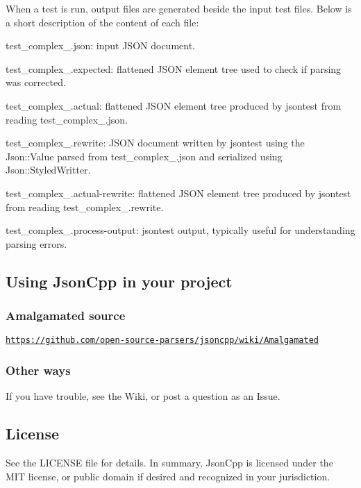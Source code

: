 When a test is run, output files are generated beside the input test files. Below is a short description of the content of each file\+:


\begin{DoxyItemize}
\item {\ttfamily test\+\_\+complex\+\_.\+json}\+: input J\+S\+ON document.
\item {\ttfamily test\+\_\+complex\+\_.\+expected}\+: flattened J\+S\+ON element tree used to check if parsing was corrected.
\item {\ttfamily test\+\_\+complex\+\_.\+actual}\+: flattened J\+S\+ON element tree produced by {\ttfamily jsontest} from reading {\ttfamily test\+\_\+complex\+\_.\+json}.
\item {\ttfamily test\+\_\+complex\+\_.\+rewrite}\+: J\+S\+ON document written by {\ttfamily jsontest} using the {\ttfamily Json\+::\+Value} parsed from {\ttfamily test\+\_\+complex\+\_.\+json} and serialized using {\ttfamily Json\+::\+Styled\+Writter}.
\item {\ttfamily test\+\_\+complex\+\_.\+actual-\/rewrite}\+: flattened J\+S\+ON element tree produced by {\ttfamily jsontest} from reading {\ttfamily test\+\_\+complex\+\_.\+rewrite}.
\item {\ttfamily test\+\_\+complex\+\_.\+process-\/output}\+: {\ttfamily jsontest} output, typically useful for understanding parsing errors.
\end{DoxyItemize}

\subsection*{Using Json\+Cpp in your project}

\subsubsection*{Amalgamated source}

\href{https://github.com/open-source-parsers/jsoncpp/wiki/Amalgamated}{\tt https\+://github.\+com/open-\/source-\/parsers/jsoncpp/wiki/\+Amalgamated}

\subsubsection*{Other ways}

If you have trouble, see the Wiki, or post a question as an Issue.

\subsection*{License}

See the {\ttfamily L\+I\+C\+E\+N\+SE} file for details. In summary, Json\+Cpp is licensed under the M\+IT license, or public domain if desired and recognized in your jurisdiction. 